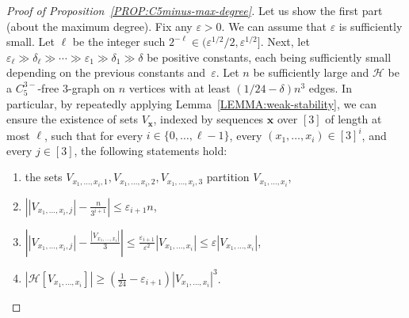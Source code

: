 \documentclass[11pt,a4paper]{article}
\theoremstyle{remark}
\begin{document}
\begin{proof}[Proof of Proposition~\ref{PROP:C5minus-max-degree}] Let us show the first part (about the maximum degree).
    Fix any $\varepsilon > 0$. We can assume that $\varepsilon$ is sufficiently small. Let $\ell$ be the integer such $2^{-\ell} \in (\varepsilon^{1/2}/2, \varepsilon^{1/2}]$. 
   Next, let $\varepsilon_{\ell}\gg \delta_{\ell}\gg \cdots \gg \varepsilon_1 \gg \delta_1 \gg \delta$ be positive constants, each being sufficiently small depending on the previous constants and~$\varepsilon$. Let $n$ be sufficiently large and $\mathcal{H}$ be a $C_{5}^{3-}$-free $3$-graph on $n$ vertices with at least $(1/24 - \delta)n^3$ edges. 
    In particular, by repeatedly applying Lemma~\ref{LEMMA:weak-stability}, 
    we can ensure the existence of sets $V_{\mathbf{x}}$, indexed by sequences $\mathbf{x}$ over $[3]$ of length at most $\ell$, such that for every $i \in \{0,\dots, \ell-1\}$, every $(x_1, \ldots, x_i) \in [3]^{i}$, and every $j\in [3]$,  the following statements hold:
    \begin{enumerate}[label=(\roman*)]
        \item\label{proof-level-one-assump-0}  the sets $V_{x_1, \ldots, x_{i},1},V_{x_1, \ldots, x_{i},2}, V_{x_1, \ldots, x_{i},3}$ partition $V_{x_1, \ldots, x_{i}}$,
        \item\label{proof-level-one-assump-1} $\left||V_{x_1, \ldots, x_i,j}| - \frac{n}{3^{i+1}}\right| \le \varepsilon_{i+1} n$, 
        \item\label{proof-level-one-assump-2} $\left||V_{x_1, \ldots, x_i, j}| - \frac{|V_{x_1, \ldots, x_i}|}{3}\right| \le \frac{\varepsilon_{i+1}}{\varepsilon^2} |V_{x_1, \ldots, x_i}| \le \varepsilon |V_{x_1, \ldots, x_i}|$, 
        \item\label{proof-level-one-assump-3} $|\mathcal{H}[V_{x_1, \ldots, x_i}]| 
        \ge \left(\frac{1}{24} - \varepsilon_{i+1}\right)|V_{x_1, \ldots, x_i}|^3$. 
    \end{enumerate}


\end{proof}
\end{document}
